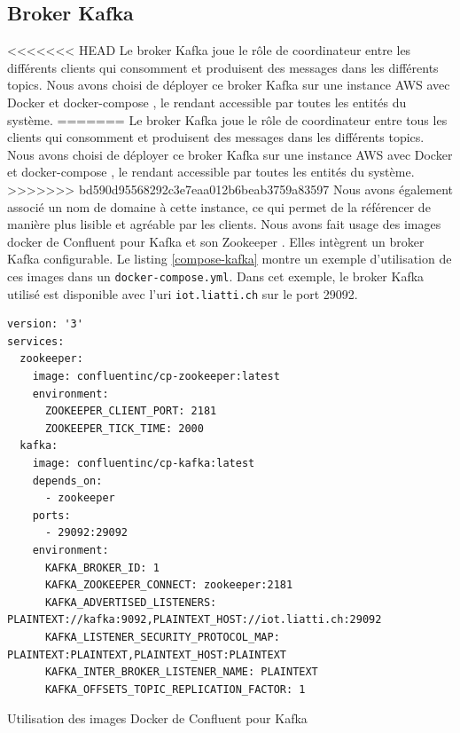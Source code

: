 \subsection{Broker Kafka}
<<<<<<< HEAD
Le broker Kafka joue le rôle de coordinateur entre les différents clients qui consomment et produisent des messages dans les différents topics. Nous avons choisi de déployer ce broker Kafka sur une instance AWS \cite{aws} avec Docker \cite{docker} et docker-compose \cite{docker-compose}, le rendant accessible par toutes les entités du système.
=======
Le broker Kafka joue le rôle de coordinateur entre tous les clients qui consomment et produisent des messages dans les différents topics. Nous avons choisi de déployer ce broker Kafka sur une instance AWS \cite{aws} avec Docker \cite{docker} et docker-compose \cite{docker-compose}, le rendant accessible par toutes les entités du système.
>>>>>>> bd590d95568292c3e7eaa012b6beab3759a83597
Nous avons également associé un nom de domaine à cette instance, ce qui permet de la référencer de manière plus lisible et agréable par les clients. Nous avons fait usage des images docker de Confluent \cite{confluent} pour Kafka \cite{cp-kafka} et son Zookeeper \cite{cp-zookeeper}. Elles intègrent un broker Kafka configurable. Le listing \ref{compose-kafka} montre un exemple d'utilisation de ces images dans un \texttt{docker-compose.yml}. Dans cet exemple, le broker Kafka utilisé est disponible avec l'\acrshort{uri} \texttt{iot.liatti.ch} sur le port 29092.
\begin{code}
    \begin{verbatim}
version: '3'
services:
  zookeeper:
    image: confluentinc/cp-zookeeper:latest
    environment:
      ZOOKEEPER_CLIENT_PORT: 2181
      ZOOKEEPER_TICK_TIME: 2000
  kafka:
    image: confluentinc/cp-kafka:latest
    depends_on:
      - zookeeper
    ports:
      - 29092:29092
    environment:
      KAFKA_BROKER_ID: 1
      KAFKA_ZOOKEEPER_CONNECT: zookeeper:2181
      KAFKA_ADVERTISED_LISTENERS: PLAINTEXT://kafka:9092,PLAINTEXT_HOST://iot.liatti.ch:29092
      KAFKA_LISTENER_SECURITY_PROTOCOL_MAP: PLAINTEXT:PLAINTEXT,PLAINTEXT_HOST:PLAINTEXT
      KAFKA_INTER_BROKER_LISTENER_NAME: PLAINTEXT
      KAFKA_OFFSETS_TOPIC_REPLICATION_FACTOR: 1
    \end{verbatim}
    \caption{Utilisation des images Docker de Confluent pour Kafka}
    \label{compose-kafka}
\end{code}

